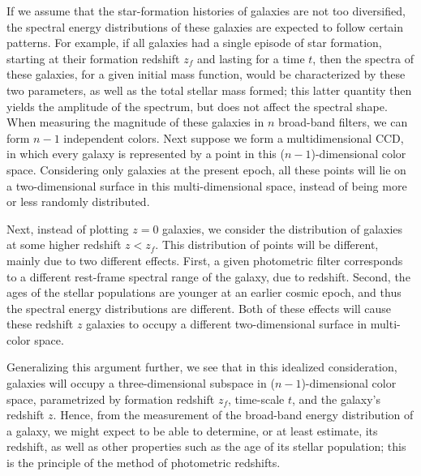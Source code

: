 \documentclass[a4paper,10pt]{article}
\begin{document}
{\noindent}If we assume that the star-formation histories of galaxies are not too diversified, the spectral energy distributions of these galaxies are expected to follow certain patterns. For example, if all galaxies had a single episode of star formation, starting at their formation redshift $z_f$ and lasting for a time $t$, then the spectra of these galaxies, for a given initial mass function, would be characterized by these two parameters, as well as the total stellar mass formed; this latter quantity then yields the amplitude of the spectrum, but does not affect the spectral shape. When measuring the magnitude of these galaxies in $n$ broad-band filters, we can form $n-1$ independent colors. Next suppose we form a multidimensional CCD, in which every galaxy is represented by a point in this ($n-1$)-dimensional color space. Considering only galaxies at the present epoch, all these points will lie on a two-dimensional surface in this multi-dimensional space, instead of being more or less randomly distributed.

{\noindent}Next, instead of plotting $z=0$ galaxies, we consider the distribution of galaxies at some higher redshift $z<z_f$. This distribution of points will be different, mainly due to two different effects. First, a given photometric filter corresponds to a different rest-frame spectral range of the galaxy, due to redshift. Second, the ages of the stellar populations are younger at an earlier cosmic epoch, and thus the spectral energy distributions are different. Both of these effects will cause these redshift $z$ galaxies to occupy a different two-dimensional surface in multi-color space.

{\noindent}Generalizing this argument further, we see that in this idealized consideration, galaxies will occupy a three-dimensional subspace in ($n-1$)-dimensional color space, parametrized by formation redshift $z_f$, time-scale $t$, and the galaxy’s redshift $z$. Hence, from the measurement of the broad-band energy distribution of a galaxy, we might expect to be able to determine, or at least estimate, its redshift, as well as other properties such as the age of its stellar population; this is the principle of the method of photometric redshifts.
\end{document}

